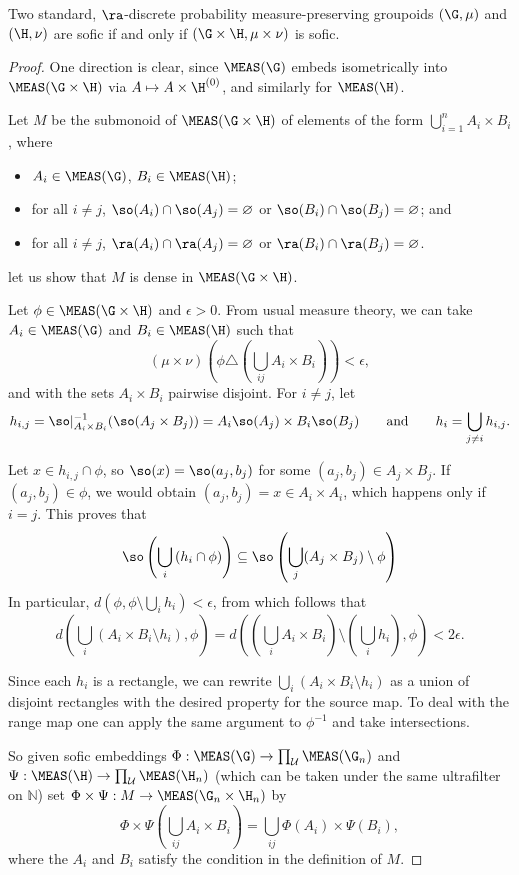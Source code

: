 \begin{theorem}
Two standard, $\ra$-discrete probability measure-preserving groupoids $(\G,\mu)$ and $(\H,\nu)$ are sofic if and only if $(\G\times \H,\mu\times\nu)$ is sofic.
\end{theorem}
\begin{proof}
One direction is clear, since $\MEAS(\G)$ embeds isometrically into $\MEAS(\G\times\H)$ via $A\mapsto A\times\H^{(0)}$, and similarly for $\MEAS(\H)$.

Let $M$ be the submonoid of $\MEAS(\G\times\H)$ of elements of the form $\bigcup_{i=1}^nA_i\times B_i$, where
\begin{itemize}
\item $A_i\in\MEAS(\G)$, $B_i\in\MEAS(\H)$;
\item for all $i\neq j$, $\so(A_i)\cap \so(A_j)=\varnothing$ or $\so(B_i)\cap \so(B_j)=\varnothing$; and
\item for all $i\neq j$, $\ra(A_i)\cap \ra(A_j)=\varnothing$ or $\ra(B_i)\cap \ra(B_j)=\varnothing$.
\end{itemize}
let us show that $M$ is dense in $\MEAS(\G\times\H)$.

Let $\phi\in\MEAS(\G\times\H)$ and $\epsilon>0$. From usual measure theory, we can take $A_i\in\MEAS(\G)$ and $B_i\in\MEAS(\H)$ such that
\[(\mu\times\nu)(\phi\triangle(\bigcup_{ij} A_i\times B_i))<\epsilon,\]
and with the sets $A_i\times B_i$ pairwise disjoint. For $i\neq j$, let 
\[h_{i,j}=\so|_{A_i\times B_i}^{-1}(\so(A_j\times B_j))=A_i\so(A_j)\times B_i\so(B_j)\qquad\text{and}\qquad h_i=\bigcup_{j\neq i}h_{i,j}.\]

Let $x\in h_{i,j}\cap\phi$, so $\so(x)=\so(a_j,b_j)$ for some $(a_j,b_j)\in A_j\times B_j$. If $(a_j,b_j)\in\phi$, we would obtain $(a_j,b_j)=x\in A_i\times A_i$, which happens only if $i=j$. This proves that
\[\so\left(\bigcup_i\left(h_i\cap\phi\right)\right)\subseteq\so\left(\bigcup_j(A_j\times B_j)\setminus\phi\right)\]
In particular, $d(\phi,\phi\setminus\bigcup_ih_i)<\epsilon$, from which follows that
\[d\left(\bigcup_i(A_i\times B_i\setminus h_i),\phi\right)=d\left(\left(\bigcup_i A_i\times B_i\right)\setminus(\bigcup_i h_i),\phi\right)<2\epsilon.\]

Since each $h_i$ is a rectangle, we can rewrite $\bigcup_i(A_i\times B_i\setminus h_i)$ as a union of disjoint rectangles with the desired property for the source map. To deal with the range map one can apply the same argument to $\phi^{-1}$ and take intersections. 

So given sofic embeddings $\Phi:\MEAS(\G)\to\prod_\mathcal{U}\MEAS(\G_n)$ and $\Psi:\MEAS(\H)\to\prod_\mathcal{U}\MEAS(\H_n)$ (which can be taken under the same ultrafilter on $\mathbb{N}$) set $\Phi\times\Psi:M\to\MEAS(\G_n\times\H_n)$ by
\[\Phi\times\Psi(\bigcup_{ij}A_i\times B_i)=\bigcup_{ij}\Phi(A_i)\times\Psi(B_i),\]
where the $A_i$ and $B_i$ satisfy the condition in the definition of $M$.


\end{proof}
